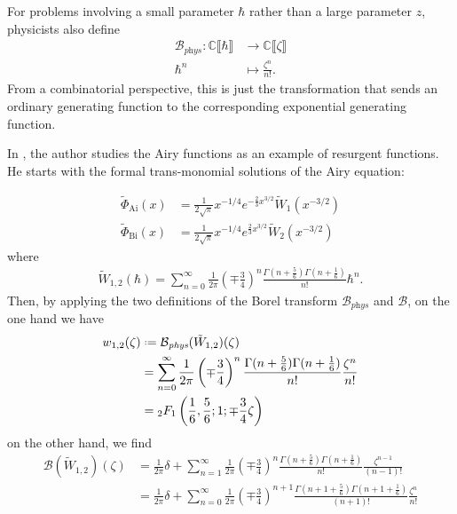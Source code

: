 \documentclass{article}
\newcommand{\maps}{\colon}
\newcommand{\C}{\mathbb{C}}
\newcommand*{\defeq}{\mathrel{\vcenter{\baselineskip0.5ex \lineskiplimit0pt
                     \hbox{\scriptsize.}\hbox{\scriptsize.}}}%
                     =}
\newcommand{\borel}{\mathcal{B}}
\theoremstyle{definition}
\theoremstyle{plain}
\begin{document}
{For problems involving a small parameter $\hbar$ rather than a large parameter $z$, physicists also define
\begin{align*}
\borel_{\textit{phys}} \maps \C \llbracket \hbar \rrbracket & \to \C \llbracket \zeta \rrbracket \\
\hbar^n & \mapsto \frac{\zeta^n}{n!}.
\end{align*}
From a combinatorial perspective, this is just the transformation that sends an ordinary generating function to the corresponding exponential generating function.

In \cite{lectures-Marino}, the author studies the Airy functions as an example of resurgent functions. He starts with the formal trans-monomial solutions of the Airy equation:

\begin{align*}
\tilde{\Phi}_{\mathrm{Ai}}(x)&=\frac{1}{2\sqrt{\pi}}x^{-1/4}e^{-\tfrac{2}{3}x^{3/2}}\tilde{W}_1(x^{-3/2})\\
\tilde{\Phi}_{\mathrm{Bi}}(x)&=\frac{1}{2\sqrt{\pi}}x^{-1/4}e^{\tfrac{2}{3}x^{3/2}}\tilde{W}_2(x^{-3/2})
\end{align*}  
where 
\begin{align*}
\tilde{W}_{1,2}(\hbar)=\sum_{n=0}^{\infty}\frac{1}{2\pi}\left(\mp\frac{3}{4}\right)^{n}\frac{\Gamma(n+\frac{5}{6})\Gamma(n+\frac{1}{6})}{n!}\hbar^n.
\end{align*}
Then, by applying the two definitions of the Borel transform $\borel_{\textit{phys}}$ and $\borel$, on the one hand we have  
\begin{align*}
w_{1,2}(\zeta)&\defeq\borel_{\textit{phys}}(\tilde{W}_{1,2})(\zeta)\\
&=\sum_{n=0}^{\infty}\frac{1}{2\pi}\left(\mp\frac{3}{4}\right)^{n}\frac{\Gamma(n+\frac{5}{6})\Gamma(n+\frac{1}{6})}{n!}\frac{\zeta^n}{n!}\\
&={}_2F_1\left(\frac{1}{6},\frac{5}{6};1;\mp\frac{3}{4}\zeta\right) 
\end{align*}
on the other hand, we find
\begin{align*}
\borel(\tilde{W}_{1,2})(\zeta)&=\frac{1}{2\pi}\delta+\sum_{n=1}^{\infty} \frac{1}{2\pi}\left(\mp\frac{3}{4}\right)^{n}\frac{\Gamma(n+\frac{5}{6})\Gamma(n+\frac{1}{6})}{n!}\frac{\zeta^{n-1}}{(n-1)!}\\
&=\frac{1}{2\pi}\delta+\sum_{n=0}^{\infty} \frac{1}{2\pi}\left(\mp\frac{3}{4}\right)^{n+1}\frac{\Gamma(n+1+\frac{5}{6})\Gamma(n+1+\frac{1}{6})}{(n+1)!}\frac{\zeta^{n}}{n!}\\

\end{align*}}
\end{document}

